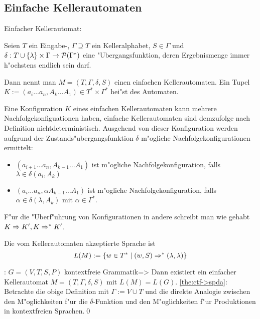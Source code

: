 \subsection{Einfache Kellerautomaten}
 Einfacher Kellerautomat:{
  Seien $T$ ein Eingabe-, $\Gamma\supseteq T$ ein Kelleralphabet, 
  $S\in\Gamma$ und $\delta:T\cup\{\lambda\}\times\Gamma\to\cal P(\Gamma^*)$ 
  eine "Ubergangsfunktion, deren Ergebnismenge immer h"ochstens endlich 
  sein darf.
  
  Dann nennt man $M=(T,\Gamma,\delta,S)$ einen einfachen Kellerautomaten. 
  Ein Tupel 
  $K:=(a_i\ldots a_n,A_k\ldots A_1)\in T^*\times\Gamma^*$ 
  hei"st  des Automaten.
  
  Eine Konfiguration $K$ eines einfachen Kellerautomaten kann mehrere 
  Nachfolgekonfiguationen haben, einfache Kellerautomaten sind demzufolge
  nach Definition nichtdeterministisch. Ausgehend von dieser Konfiguration
  werden aufgrund der Zustands"ubergangsfunktion $\delta$ m"ogliche 
  Nachfolgekonfigurationen ermittelt:
  \begin{itemize}
    \item 
      $(a_{i+1}\ldots a_n,A_{k-1}\ldots A_1)$ ist m"ogliche 
      Nachfolgekonfiguration, falls $\lambda\in\delta(a_i,A_k)$
    \item 
      $(a_i\ldots a_n,\alpha A_{k-1}\ldots A_1)$ ist m"ogliche 
      Nachfolgekonfiguration, falls $\alpha\in\delta(\lambda,A_k)$ mit
      $\alpha\in\Gamma^*$.
    \end{itemize}
  F"ur die "Uberf"uhrung von Konfigurationen in andere schreibt man
  wie gehabt $K\dderivable K', K\derivable K'$. 

  Die vom Kellerautomaten akzeptierte Sprache ist
  \[L(M):=\{w\in T^*\mid (w,S)\derivable (\lambda,\lambda)\}
    \]
  }
\theorem:
  $G=(V,T,S,P)$ kontextfreie Grammatik=>{
  \label{the:ctf->spda}
  Dann existiert ein einfacher Kellerautomat $M=(T,\Gamma,\delta,S)$
  mit $L(M)=L(G)$.
  }
\proof \ref{the:ctf->spda}:{
  Betrachte die obige Definition mit $\Gamma:=V\cup T$ und die direkte Analogie
  zwischen den M"oglichkeiten f"ur die $\delta$-Funktion und den M"oglichkeiten
  f"ur Produktionen in kontextfreien Sprachen.\qed
  }
